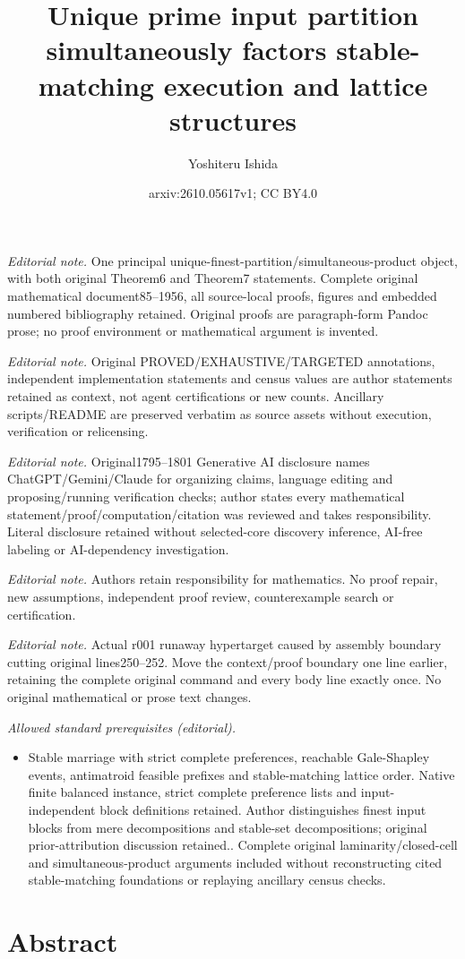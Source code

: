 \documentclass[
  11pt,
]{article}
\title{Unique prime input partition simultaneously factors stable-matching execution and lattice structures}
\author{Yoshiteru Ishida}
\date{arxiv:2610.05617v1; CC BY4.0}
\begin{document}
\maketitle
\noindent\textit{Editorial note.} One principal unique-finest-partition/simultaneous-product object, with both original Theorem6 and Theorem7 statements. Complete original mathematical document85--1956, all source-local proofs, figures and embedded numbered bibliography retained. Original proofs are paragraph-form Pandoc prose; no proof environment or mathematical argument is invented.\par\medskip
\noindent\textit{Editorial note.} Original PROVED/EXHAUSTIVE/TARGETED annotations, independent implementation statements and census values are author statements retained as context, not agent certifications or new counts. Ancillary scripts/README are preserved verbatim as source assets without execution, verification or relicensing.\par\medskip
\noindent\textit{Editorial note.} Original1795--1801 Generative AI disclosure names ChatGPT/Gemini/Claude for organizing claims, language editing and proposing/running verification checks; author states every mathematical statement/proof/computation/citation was reviewed and takes responsibility. Literal disclosure retained without selected-core discovery inference, AI-free labeling or AI-dependency investigation.\par\medskip
\noindent\textit{Editorial note.} Authors retain responsibility for mathematics. No proof repair, new assumptions, independent proof review, counterexample search or certification.\par\medskip
\noindent\textit{Editorial note.} Actual r001 runaway hypertarget caused by assembly boundary cutting original lines250--252. Move the context/proof boundary one line earlier, retaining the complete original command and every body line exactly once. No original mathematical or prose text changes.\par\medskip
\noindent\textit{Allowed standard prerequisites (editorial).}\begin{itemize}
\item Stable marriage with strict complete preferences, reachable Gale-Shapley events, antimatroid feasible prefixes and stable-matching lattice order. Native finite balanced instance, strict complete preference lists and input-independent block definitions retained. Author distinguishes finest input blocks from mere decompositions and stable-set decompositions; original prior-attribution discussion retained.. Complete original laminarity/closed-cell and simultaneous-product arguments included without reconstructing cited stable-matching foundations or replaying ancillary census checks.
\end{itemize}\medskip
{}
\hypertarget{abstract}{%
\section{Abstract}\label{abstract}}
\end{document}
